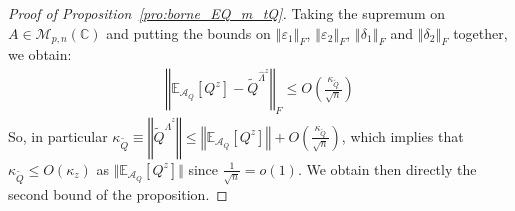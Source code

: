 \documentclass[a4papaer, titlepage]{book}
\begin{document}
\begin{proof}[Proof of Proposition~\ref{pro:borne_EQ_m_tQ}]
    Taking the supremum on $A \in \mathcal M_{p,n}(\mathbb C)$ and putting the bounds on $\left\Vert \varepsilon_1 \right\Vert_F$, $\left\Vert \varepsilon_2 \right\Vert_F$, $\left\Vert \delta_1 \right\Vert_F$ and $\left\Vert \delta_2 \right\Vert_F$ together, we obtain:
    \begin{align*}
      \left\Vert \mathbb{E}_{\mathcal A_Q} \left[Q^z\right] - \tilde Q^{\hat \Lambda^z} \right\Vert_ F \leq O \left(\frac{\kappa_{\tilde Q}}{\sqrt{n}}\right)
    \end{align*}
    So, in particular $\kappa_{\tilde Q} \equiv\left\Vert \tilde Q^{\hat \Lambda^z} \right\Vert \leq  \left\Vert \mathbb{E}_{\mathcal A_Q} \left[Q^z\right] \right\Vert + O \left(\frac{\kappa_{\tilde Q}}{\sqrt{n}}\right)$,
    which implies that $\kappa_{\tilde Q} \leq O(\kappa_z)$ as $\Vert \mathbb{E}_{\mathcal A_Q} \left[Q^z\right] \Vert$ since $\frac{1}{\sqrt n} = o(1)$. We obtain then directly the second bound of the proposition.
\end{proof}
\end{document}
